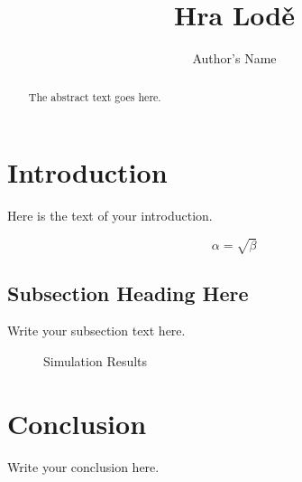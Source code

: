 \documentclass{article}
\begin{document}
\title{Hra Lodě}
\author{Author's Name}

\maketitle

\begin{abstract}
The abstract text goes here.
\end{abstract}

\section{Introduction}
Here is the text of your introduction.

\begin{equation}
    \label{simple_equation}
    \alpha = \sqrt{ \beta }
\end{equation}

\subsection{Subsection Heading Here}
Write your subsection text here.

\begin{figure}
    \centering
    \caption{Simulation Results}
    \label{simulationfigure}
\end{figure}

\section{Conclusion}
Write your conclusion here.
\end{document}
